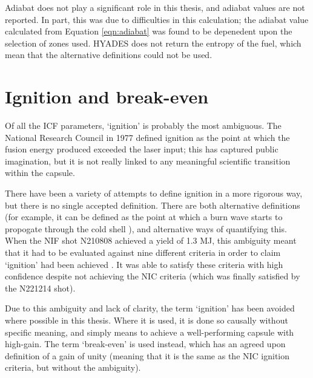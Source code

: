 Adiabat does not play a significant role in this thesis, and adiabat values are not reported. In part, this was due to difficulties in this calculation; the adiabat value calculated from Equation \ref{eqn:adiabat} was found to be depenedent upon the selection of zones used. HYADES does not return the entropy of the fuel, which mean that the alternative definitions could not be used.


\section{Ignition and break-even}
Of all the ICF parameters, `ignition' is probably the most ambiguous. The National Research Council in 1977 defined ignition as the point at which the fusion energy produced exceeded the laser input; this has captured public imagination, but it is not really linked to any meaningful scientific transition within the capsule.

There have been a variety of attempts to define ignition in a more rigorous way, but there is no single accepted definition. There are both alternative definitions (for example, it can be defined as the point at which a burn wave starts to propogate through the cold shell \cite{Christopherson2020}), and alternative ways of quantifying this. When the NIF shot N210808 achieved a yield of 1.3 MJ, this ambiguity meant that it had to be evaluated against nine different criteria in order to claim `ignition' had been achieved \cite{Abu-Shawareb2022}. It was able to satisfy these criteria with high confidence despite not achieving the NIC criteria (which was finally satisfied by the N221214 shot).

Due to this ambiguity and lack of clarity, the term `ignition' has been avoided where possible in this thesis. Where it is used, it is done so causally without specific meaning, and simply means to achieve a well-performing capsule with high-gain. The term `break-even' is used instead, which has an agreed upon definition of a gain of unity (meaning that it is the same as the NIC ignition criteria, but without the ambiguity).